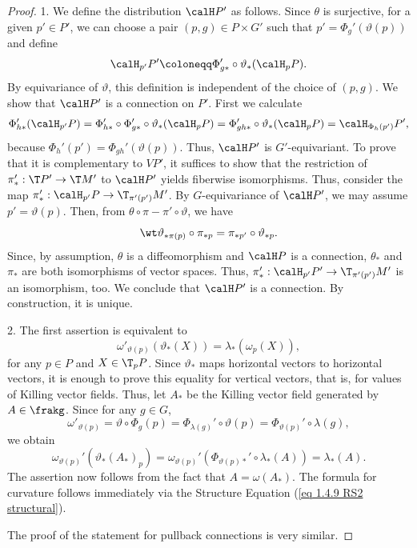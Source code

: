 \begin{proof}
    1. We define the distribution $\calH P'$ as follows. Since $\theta$ is surjective, for a given $p'\in P'$, we can choose a pair $(p,g)\in P\times G'$ such that $p'=\Phi_g'(\vartheta(p))$ and define
    \[\calH_{p'}P'\coloneqq \Phi_{g\ast}'\circ \vartheta_\ast (\calH_{p}P).\]
    By equivariance of $\vartheta$, this definition is independent of the choice of $(p,g)$. We show that $\calH P'$ is a connection on $P'$. First we calculate
    \[\Phi_{h\ast}'(\calH_{p'}P)=\Phi_{h\ast}'\circ \Phi_{g\ast}'\circ\vartheta_\ast(\calH_p P)=\Phi_{gh\ast}'\circ\vartheta_\ast(\calH_pP)=\calH_{\Phi_h(p')}P',\]
    because $\Phi_h'(p')=\Phi_{gh}'(\vartheta(p))$. Thus, $\calH P'$ is $G'$-equivariant. To prove that it is complementary to $VP'$, it suffices to show that the restriction of $\pi_\ast':\T P'\to \T M'$ to $\calH P'$ yields fiberwise isomorphisms. Thus, consider the map $\pi_\ast':\calH_{p'}P\to \T_{\pi'(p')}M'$. By $G$-equivariance of $\calH P'$, we may assume $p'=\vartheta(p)$. Then, from $\theta\circ\pi-\pi'\circ\vartheta$, we have
    \[\wt\vartheta_{\ast\pi(p)}\circ \pi_{\ast p}=\pi_{\ast p'}\circ\vartheta_{\ast p}.\]
    Since, by assumption, $\theta$ is a diffeomorphism and $\calH P$ is a connection, $\theta_\ast$ and $\pi_\ast$ are both isomorphisms of vector spaces. Thus, $\pi_\ast':\calH_{p'}P'\to \T_{\pi'(p')}M'$ is an isomorphism, too. We conclude that $\calH P'$ is a connection. By construction, it is unique.

    2. The first assertion is equivalent to
    \[\omega'_{\vartheta(p)}(\vartheta_\ast(X))=\lambda_\ast(\omega_p(X)),\]
    for any $p\in P$ and $X\in \T_pP$. Since $\vartheta_\ast$ maps horizontal vectors to horizontal vectors, it is enough to prove this equality for vertical vectors, that is, for values of Killing vector fields. Thus, let $A_\ast$ be the Killing vector field generated by $A\in\frakg$. Since for any $g\in G$,
    \[\omega'_{\vartheta(p)}=\vartheta\circ \Phi_g(p)=\Phi_{\lambda(g)}'\circ\vartheta(p)=\Phi_{\vartheta(p)}'\circ\lambda(g),\]
    we obtain
    \[\omega_{\vartheta(p)}'\left(\vartheta_\ast(A_\ast)_p\right)=\omega_{\vartheta(p)}'\left(\Phi_{\vartheta(p)\ast}'\circ \lambda_\ast(A)\right)=\lambda_\ast(A).\]
    The assertion now follows from the fact that $A=\omega(A_\ast)$. The formula for curvature follows immediately via the Structure Equation (\ref{eq 1.4.9 RS2 structural}).

    The proof of the statement for pullback connections is very similar.
\end{proof}

